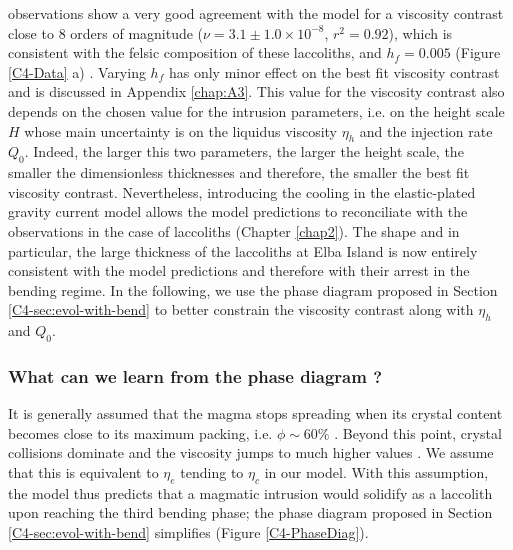 observations show a very good agreement with the model for a viscosity
contrast      close      to      $8$     orders      of      magnitude
($\nu = 3.1\pm  1.0 \times 10^{-8}$, $r^2=0.92$),  which is consistent
with  the  felsic composition  of  these  laccoliths, and  $h_f=0.005$
(Figure \ref{C4-Data} a) \citep{Marsh:1981dc,Diniega:2013eh}.  Varying
$h_f$ has only minor effect on  the best fit viscosity contrast and is
discussed  in Appendix  \ref{chap:A3}.  This  value for  the viscosity
contrast  also  depends   on  the  chosen  value   for  the  intrusion
parameters, i.e. on the height scale  $H$ whose main uncertainty is on
the liquidus viscosity $\eta_h$ and the injection rate $Q_0$.  Indeed,
the  larger this  two parameters,  the  larger the  height scale,  the
smaller the  dimensionless thicknesses and therefore,  the smaller the
best fit viscosity contrast.  Nevertheless, introducing the cooling in
the elastic-plated gravity current  model allows the model predictions
to  reconciliate  with the  observations  in  the case  of  laccoliths
(Chapter  \ref{chap2}).   The  shape  and  in  particular,  the  large
thickness of the laccoliths at  Elba Island is now entirely consistent
with  the model  predictions and  therefore with  their arrest  in the
bending regime.  In  the following, we use the  phase diagram proposed
in  Section   \ref{C4-sec:evol-with-bend}  to  better   constrain  the
viscosity contrast along with $\eta_h$ and $Q_0$.

\subsubsection*{What can we learn from the phase diagram ?}

It  is generally  assumed  that  the magma  stops  spreading when  its
crystal   content  becomes   close  to   its  maximum   packing,  i.e.
$\phi  \sim  60\%$   \citep{Pinkerton:1992fwa}.   Beyond  this  point,
crystal collisions  dominate and  the viscosity  jumps to  much higher
values \citep{Lejeune:1995fc,Giordano:2008em}.  We assume that this is
equivalent to  $\eta_e$ tending to  $\eta_c$ in our model.   With this
assumption, the  model thus predicts  that a magmatic  intrusion would
solidify as  a laccolith  upon reaching the  third bending  phase; the
phase   diagram   proposed  in   Section   \ref{C4-sec:evol-with-bend}
simplifies (Figure \ref{C4-PhaseDiag}).

